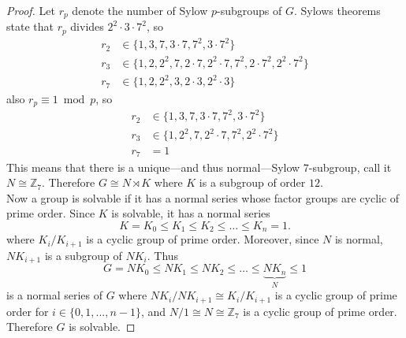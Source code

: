 \documentclass{article}
\newcommand{\Z}{\mathbb Z}
\newcommand{\set}[1]{\{#1\}}
\begin{document}
\begin{proof}
  Let $r_p$ denote the number of Sylow $p$-subgroups of $G$. Sylows theorems
  state that $r_p$ divides $2^2 \cdot 3 \cdot 7^2$, so \begin{align*}
    r_2 &\in \set{1, 3, 7, 3 \cdot 7, 7^2, 3 \cdot 7^2} \\
    r_3 &\in \set{1, 2, 2^2, 7, 2 \cdot 7, 2^2 \cdot 7, 7^2, 2 \cdot 7^2, 2^2 \cdot 7^2} \\
    r_7 &\in \set{1, 2, 2^2, 3, 2 \cdot 3, 2^2 \cdot 3}
  \end{align*} also $r_p \equiv 1 \bmod p$, so
  \begin{align*}
    r_2 &\in \set{1, 3, 7, 3 \cdot 7, 7^2, 3 \cdot 7^2} \\
    r_3 &\in \set{1, 2^2, 7, 2^2 \cdot 7, 7^2, 2^2 \cdot 7^2} \\
    r_7 &= 1
  \end{align*}
  This means that there is a unique---and thus normal---Sylow $7$-subgroup,
  call it $N \cong \Z_7$.
  Therefore $G \cong N \rtimes K$ where $K$ is a subgroup of order $12$.
  \\
  Now a group is solvable if it has a normal series whose factor groups are
  cyclic of prime order. Since $K$ is solvable, it has a normal series \[
    K = K_0 \leq K_1 \leq K_2 \leq \hdots \leq K_n = 1.
  \] where $K_{i}/K_{i+1}$ is a cyclic group of prime order.
  Moreover, since $N$ is normal, $NK_{i+1}$ is a subgroup of $NK_{i}$. Thus \[
    G = NK_0 \leq NK_1 \leq NK_2 \leq \hdots \leq \underbrace{NK_n}_N \leq 1
  \] is a normal series of $G$ where $NK_{i}/NK_{i+1} \cong K_{i}/K_{i+1}$ is a
  cyclic group of prime order for $i \in \set{0,1,..., n-1}$, and
  $N/1 \cong N \cong \Z_7$ is a cyclic group of prime order.
  Therefore $G$ is solvable.
\end{proof}
\end{document}
